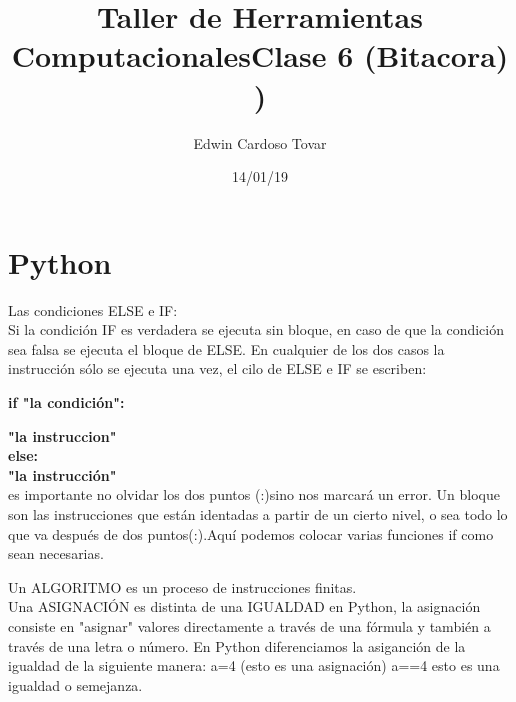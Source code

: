 \documentclass[letterpaper, 12pt, oneside]{article}%
\title{\Huge Taller de Herramientas Computacionales}
\author{Edwin Cardoso Tovar}%
\date{14/01/19}%
\begin{document}
	\maketitle
	\begin{center}%
	\end{center}%
	\newpage%
	
	\title{\textbf{\Huge Clase 6 (Bitacora)\\}) \\}%
	
	
	\section*{\Huge Python\\} 
	
	Las condiciones ELSE e IF:\\
	Si la condición IF es verdadera se ejecuta sin bloque, en caso de que la condición sea falsa se ejecuta el bloque de ELSE. En cualquier de los dos casos la instrucción sólo se ejecuta una vez, el cilo de ELSE e IF se escriben:
	
	\textbf{if "la condición":}\ 
	
	\textbf{"la instruccion"}\\
	\textbf{else:}\\
	\textbf{"la instrucción"}\\
	es importante no olvidar los dos puntos (:)sino nos marcará un error.
	Un bloque son las instrucciones que están identadas a partir de un cierto nivel, o sea todo lo que va después de dos puntos(:).Aquí podemos colocar varias funciones if como sean necesarias.
	
	Un ALGORITMO es un proceso de instrucciones finitas.\\
	
	Una ASIGNACIÓN es distinta de una IGUALDAD en Python, la asignación consiste en "asignar" valores directamente  a través de una fórmula y también a través de una letra o número. En Python diferenciamos la asiganción de la igualdad de la siguiente manera:
	a=4 (esto es una asignación)
	a==4 esto es una igualdad o semejanza.\\
	
\end{document}
